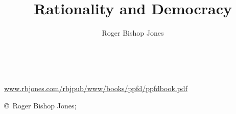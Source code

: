 \documentclass[10pt,titlepage]{book}
\author{Roger Bishop Jones}
\title{Rationality and Democracy}
\newcommand{\ignore}[1]{}
\begin{document}
\frontmatter

\begin{titlepage}
\maketitle

\vfill

\begin{centering}

\ignore{
{\parskip=0.3in
This book is dedicated to

{\relsize{+3} Barbara Anne Jones}
}
}
\ 

\vfill

{\footnotesize


\href{http://www.rbjones.com/rbjpub/www/books/ppfd/ppfdbook.pdf}{www.rbjones.com/rbjpub/www/books/ppfd/ppfdbook.pdf}


\copyright\ Roger Bishop Jones;

}%

\end{centering}

\thispagestyle{empty}
\end{titlepage}

{\parskip=0pt\tableofcontents}
\end{document}
